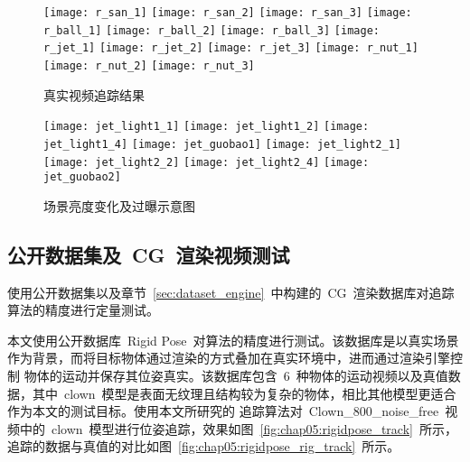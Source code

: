 \begin{figure}[t] %
    \centering%
        \texttt{[image: r\_san\_1]}
        \texttt{[image: r\_san\_2]}
        \texttt{[image: r\_san\_3]}
        \vskip 1pt
        \texttt{[image: r\_ball\_1]}
        \texttt{[image: r\_ball\_2]}
        \texttt{[image: r\_ball\_3]}
        \vskip 1pt
        \texttt{[image: r\_jet\_1]}
        \texttt{[image: r\_jet\_2]}
        \texttt{[image: r\_jet\_3]}
        \vskip 1pt
        \texttt{[image: r\_nut\_1]}
        \texttt{[image: r\_nut\_2]}
        \texttt{[image: r\_nut\_3]}
    \caption{真实视频追踪结果}
    \label{fig:chap05:real_video_tracking}
    \end{figure}
    \begin{figure}[H] %
        \centering%
            \texttt{[image: jet\_light1\_1]}
            \texttt{[image: jet\_light1\_2]}
            \texttt{[image: jet\_light1\_4]}
            \texttt{[image: jet\_guobao1]}
            \vskip 1pt
            \texttt{[image: jet\_light2\_1]}
            \texttt{[image: jet\_light2\_2]}
            \texttt{[image: jet\_light2\_4]}
            \texttt{[image: jet\_guobao2]}
        \caption{场景亮度变化及过曝示意图}
        \label{fig:chap05:light_change_test}
        \end{figure}

\subsection{公开数据集及~CG~渲染视频测试}
\label{sec:cg_video_open_dataset_test}
使用公开数据集以及章节~\ref{sec:dataset_engine}~中构建的~CG~渲染数据库对追踪算法的精度进行定量测试。


本文使用公开数据库~Rigid Pose\cite{PauwelsRealTimeModelBasedRigid2013}~对算法的精度进行测试。该数据库是以真实场景作为背景，而将目标物体通过渲染的方式叠加在真实环境中，进而通过渲染引擎控制
物体的运动并保存其位姿真实。该数据库包含~6~种物体的运动视频以及真值数据，其中~clown~模型是表面无纹理且结构较为复杂的物体，相比其他模型更适合作为本文的测试目标。使用本文所研究的
追踪算法对~Clown\_800\_noise\_free~视频中的~clown~模型进行位姿追踪，效果如图~\ref{fig:chap05:rigidpose_track}~所示，追踪的数据与真值的对比如图~\ref{fig:chap05:rigidpose_rig_track}~所示。

